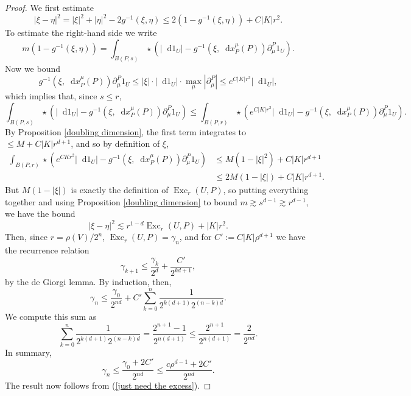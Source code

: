 \documentclass[reqno,10pt]{amsart}
\DeclareMathOperator{\Exc}{Exc}
\newcommand*\dif{\mathop{}\!\mathrm{d}}
\newtheorem{claim}{Claim}[theorem]
\theoremstyle{definition}
\numberwithin{equation}{section}
\begin{document}
\begin{proof}
We first estimate
$$|\xi - \eta|^2 = |\xi|^2 + |\eta|^2 - 2 g^{-1}(\xi, \eta) \leq 2(1 - g^{-1}(\xi, \eta)) + C|K|r^2.$$
To estimate the right-hand side we write 
$$m(1 - g^{-1}(\xi, \eta)) = \int_{B(P, s)} \star(|\dif 1_U| - g^{-1}(\xi, \dif x^\mu_P(P)) \partial^P_\mu 1_U).$$
Now we bound 
$$ g^{-1}(\xi, \dif x^\mu_P(P)) \partial^P_\mu 1_U \leq |\xi| \cdot |\dif 1_U| \cdot \max_\mu |\partial^P_\mu| \leq e^{C|K|r^2} |\dif 1_U|,$$
which implies that, since $s \leq r$,
$$\int_{B(P, s)} \star(|\dif 1_U| - g^{-1}(\xi, \dif x^\mu_P(P)) \partial^P_\mu 1_U) \leq \int_{B(P, r)} \star(e^{C|K|r^2} |\dif 1_U| - g^{-1}(\xi, \dif x^\mu_P(P)) \partial^P_\mu 1_U).$$
By Proposition \ref{doubling dimension}, the first term integrates to $\leq M + C|K|r^{d + 1}$, and so by definition of $\xi$,
\begin{align*}
\int_{B(P, r)} \star(e^{CKr^2} |\dif 1_U| - g^{-1}(\xi, \dif x^\mu_P(P)) \partial^P_\mu 1_U) &\leq M(1 - |\xi|^2) + C|K|r^{d + 1}\\
&\leq 2M(1 - |\xi|) + C|K|r^{d + 1}.
\end{align*}
But $M(1 - |\xi|)$ is exactly the definition of $\Exc_r(U, P)$, so putting everything together and using Proposition \ref{doubling dimension} to bound $m \gtrsim s^{d - 1} \gtrsim r^{d - 1}$, we have the bound 
\begin{equation}\label{just need the excess}
|\xi - \eta|^2 \lesssim r^{1 - d} \Exc_r(U, P) + |K|r^2.
\end{equation}
Then, since $r = \rho(V)/2^n$, $\Exc_r(U, P) = \gamma_n$, and for $C' := C|K|\rho^{d + 1}$ we have the recurrence relation 
$$\gamma_{k + 1} \leq \frac{\gamma_k}{2^d} + \frac{C'}{2^{k{d + 1}}},$$
by the de Giorgi lemma.
By induction, then,
$$\gamma_n \leq \frac{\gamma_0}{2^{nd}} + C' \sum_{k=0}^n \frac{1}{2^{k(d + 1)} 2^{(n - k)d}}.$$
We compute this sum as 
$$\sum_{k=0}^n \frac{1}{2^{k(d + 1)} 2^{(n - k)d}} = \frac{2^{n + 1} - 1}{2^{n(d + 1)}} \leq \frac{2^{n + 1}}{2^{n(d + 1)}} = \frac{2}{2^{nd}}.$$
In summary, 
$$\gamma_n \leq \frac{\gamma_0 + 2C'}{2^{nd}} \leq \frac{c\rho^{d - 1} + 2C'}{2^{nd}}.$$
The result now follows from (\ref{just need the excess}).


\end{proof}
\end{document}
